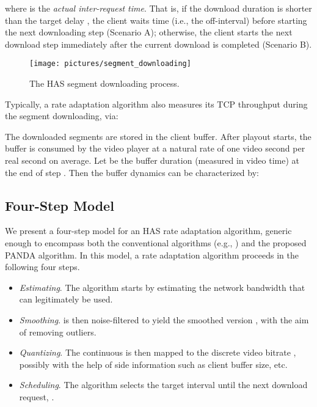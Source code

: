 \documentclass[conference]{IEEEtran}
\theoremstyle{plain}
\theoremstyle{definition}
\theoremstyle{plain}
\theoremstyle{plain}
\begin{document}
where  is the \emph{actual inter-request time}. That is, if
the download duration  is shorter than the target delay
, the client waits time  (i.e.,
the off-interval) before starting the next downloading step (Scenario
A); otherwise, the client starts the next download step immediately
after the current download is completed (Scenario B).

\begin{figure}
\begin{centering}
\texttt{[image: pictures/segment\_downloading]} 
\par\end{centering}

\vspace{-0.1in}
\caption{The HAS segment downloading process.}


\label{Flo:delay2} \vspace{-0.15in}
\end{figure}


Typically, a rate adaptation algorithm also measures its TCP throughput
 during the segment downloading, via:




The downloaded segments are stored in the client buffer. After playout
starts, the buffer is consumed by the video player at a natural rate
of one video second per real second on average. Let  be the
buffer duration (measured in video time) at the end of step .
Then the buffer dynamics can be characterized by:




\subsection{Four-Step Model\label{sub:Four-Step-Model}}

We present a four-step model for an HAS rate adaptation algorithm,
generic enough to encompass both the conventional algorithms (e.g.,
\cite{Liu:MMSys11,Tian:CoNext12,Zhou:VCIP12,Miller:PV12,Liu:SPIC12})
and the proposed PANDA algorithm. In this model, a rate adaptation
algorithm proceeds in the following four steps.
\begin{itemize}
\item \emph{Estimating}. The algorithm starts by estimating the network
bandwidth  that can legitimately be used.
\item \emph{Smoothing}.  is then noise-filtered to yield the
smoothed version , with the aim of removing outliers.
\item \emph{Quantizing}. The continuous  is then mapped to
the discrete video bitrate , possibly with the
help of side information such as client buffer size, etc.
\item \emph{Scheduling}. The algorithm selects the target interval until
the next download request, .
\end{itemize}
\end{document}
